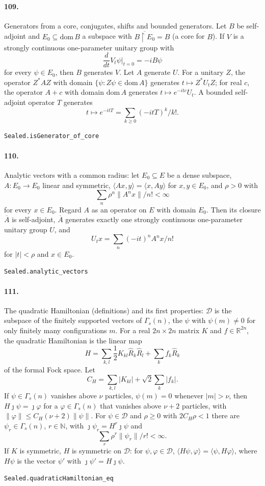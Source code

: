 \documentclass[11pt]{article}
\begin{document}
\paragraph{109.} Generators from a core, conjugates, shifts and bounded generators. Let $B$ be self-adjoint and $E_0 \subseteq \mathrm{dom}\, B$ a subspace with $\overline{B \restriction E_0} = B$ (a core for $B$). If $V$ is a strongly continuous one-parameter unitary group with \[\frac{d}{dt} V_t\psi\big|_{t=0} = -iB\psi\] for every $\psi \in E_0$, then $B$ generates $V$. Let $A$ generate $U$. For a unitary $Z$, the operator $Z^*AZ$ with domain $\{\psi : Z\psi \in \mathrm{dom}\, A\}$ generates $t \mapsto Z^*U_tZ$; for real $c$, the operator $A + c$ with domain $\mathrm{dom}\, A$ generates $t \mapsto e^{-itc}U_t$. A bounded self-adjoint operator $T$ generates \[t \mapsto e^{-itT} = \sum_{k \ge 0} (-itT)^k/k!.\]\par{\footnotesize\texttt{Sealed.isGenerator\_of\_core}}

\paragraph{110.} Analytic vectors with a common radius: let $E_0 \subseteq E$ be a dense subspace, $A : E_0 \to E_0$ linear and symmetric, $\langle Ax, y\rangle = \langle x, Ay\rangle$ for $x, y \in E_0$, and $\rho > 0$ with \[\sum_n \rho^n \|A^n x\|/n! < \infty\] for every $x \in E_0$. Regard $A$ as an operator on $E$ with domain $E_0$. Then its closure $\overline A$ is self-adjoint, $\overline A$ generates exactly one strongly continuous one-parameter unitary group $U$, and \[U_t x = \sum_n (-it)^n A^n x/n!\] for $|t| < \rho$ and $x \in E_0$.\par{\footnotesize\texttt{Sealed.analytic\_vectors}}

\paragraph{111.} The quadratic Hamiltonian (definitions) and its first properties: $\mathcal D$ is the subspace of the finitely supported vectors of $\Gamma_s(n)$, the $\psi$ with $\psi(m) \ne 0$ for only finitely many configurations $m$. For a real $2n \times 2n$ matrix $K$ and $f \in \mathbb R^{2n}$, the quadratic Hamiltonian is the linear map \[H = \sum_{k,l} \frac12 K_{kl} \hat R_k \hat R_l + \sum_k f_k \hat R_k\] of the formal Fock space. Let \[C_H = \sum_{k,l} |K_{kl}| + \sqrt2 \sum_k |f_k|.\] If $\psi \in \Gamma_s(n)$ vanishes above $\nu$ particles, $\psi(m) = 0$ whenever $|m| > \nu$, then $H\jmath\psi = \jmath\varphi$ for a $\varphi \in \Gamma_s(n)$ that vanishes above $\nu + 2$ particles, with $\|\varphi\| \le C_H(\nu + 2)\|\psi\|$. For $\psi \in \mathcal D$ and $\rho \ge 0$ with $2C_H\rho < 1$ there are $\psi_r \in \Gamma_s(n)$, $r \in \mathbb N$, with $\jmath\psi_r = H^r\jmath\psi$ and \[\sum_r \rho^r \|\psi_r\|/r! < \infty.\] If $K$ is symmetric, $H$ is symmetric on $\mathcal D$: for $\psi, \varphi \in \mathcal D$, $\langle H\psi, \varphi\rangle = \langle \psi, H\varphi\rangle$, where $H\psi$ is the vector $\psi'$ with $\jmath\psi' = H\jmath\psi$.\par{\footnotesize\texttt{Sealed.quadraticHamiltonian\_eq}}
\end{document}
